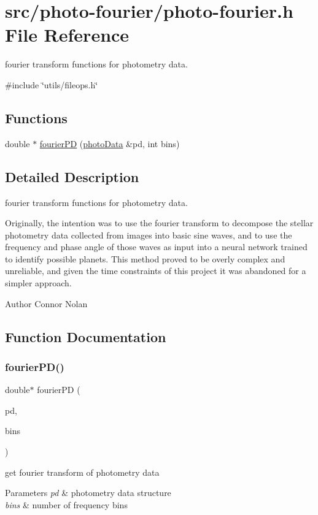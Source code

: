 \hypertarget{photo-fourier_8h}{}\section{src/photo-\/fourier/photo-\/fourier.h File Reference}
\label{photo-fourier_8h}


fourier transform functions for photometry data.  


{\ttfamily \#include \char`\"{}utils/fileops.\+h\char`\"{}}\newline
\subsection*{Functions}
\begin{DoxyCompactItemize}
\item 
double $\ast$ \mbox{\hyperlink{photo-fourier_8h_a6409c48ec831f9c42e890054e1a620a2}{fourier\+PD}} (\mbox{\hyperlink{structphotoData}{photo\+Data}} \&pd, int bins)
\end{DoxyCompactItemize}


\subsection{Detailed Description}
fourier transform functions for photometry data. 

Originally, the intention was to use the fourier transform to decompose the stellar photometry data collected from images into basic sine waves, and to use the frequency and phase angle of those waves as input into a neural network trained to identify possible planets. This method proved to be overly complex and unreliable, and given the time constraints of this project it was abandoned for a simpler approach.

\begin{DoxyAuthor}{Author}
Connor Nolan 
\end{DoxyAuthor}


\subsection{Function Documentation}
\mbox{\label{photo-fourier_8h_a6409c48ec831f9c42e890054e1a620a2}} 
\subsubsection{\texorpdfstring{fourier\+P\+D()}{fourierPD()}}
{\footnotesize\ttfamily double$\ast$ fourier\+PD (\begin{DoxyParamCaption}\item[{\mbox{\hyperlink{structphotoData}{photo\+Data}} \&}]{pd,  }\item[{int}]{bins }\end{DoxyParamCaption})}

get fourier transform of photometry data


\begin{DoxyParams}{Parameters}
{\em pd} & photometry data structure \\
\hline
{\em bins} & number of frequency bins \\
\hline
\end{DoxyParams}
